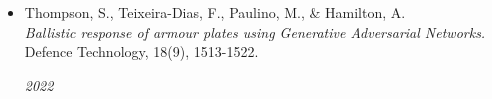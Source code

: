\documentclass[letterpaper,11pt]{article}
\begin{document}
\begin{itemize}[leftmargin=0.2in, label={}]
  \item
      \begin{minipage}[t]{0.75\linewidth}
          Thompson, S., Teixeira-Dias, F., Paulino, M., \& Hamilton, A. \\
          \textit{Ballistic response of armour plates using Generative Adversarial Networks.} \\
          Defence Technology, 18(9), 1513-1522.
      \end{minipage} \hfill \textit{2022}
\end{itemize}
\end{document}
